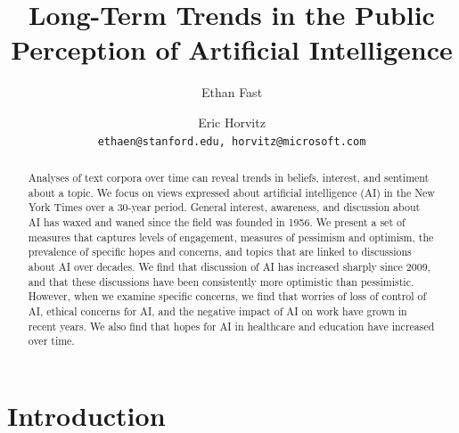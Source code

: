\documentclass[letterpaper]{article}
\begin{document}
%
\title{Long-Term Trends in the Public Perception of Artificial Intelligence}
\author{Ethan Fast \and Eric Horvitz\\
  {\tt ethaen@stanford.edu, horvitz@microsoft.com}}

\maketitle
\begin{abstract}
Analyses of text corpora over time can reveal trends in beliefs, interest, and sentiment about a topic. We focus on views expressed about artificial intelligence (AI) in the New York Times over a 30-year period. General interest, awareness, and discussion about AI has waxed and waned since the field was founded in 1956. We present a set  of measures that captures levels of engagement, measures of pessimism and optimism, the prevalence of specific hopes and concerns, and topics that are linked to discussions about AI over decades. We find that discussion of AI has increased sharply since 2009, and that these discussions have been consistently more optimistic than pessimistic. However, when we examine specific concerns, we find that worries of loss of control of AI, ethical concerns for AI, and the negative impact of AI on work have grown in recent years. We also find that hopes for AI in healthcare and education have increased over time.
\end{abstract}

\section{Introduction}
\end{document}
